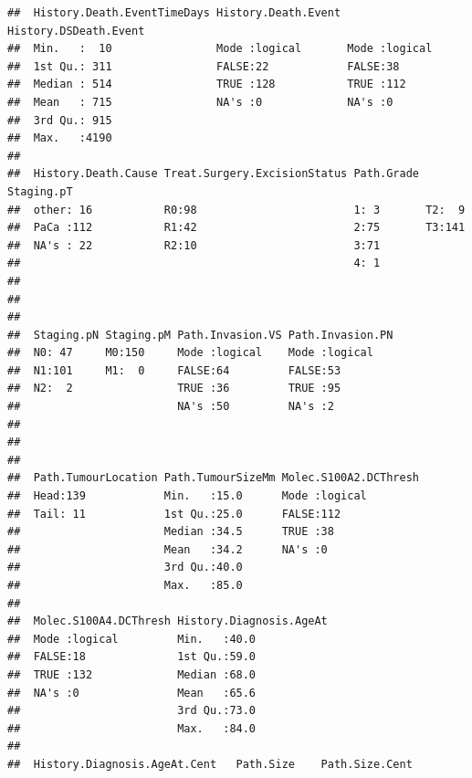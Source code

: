 \documentclass{article}\usepackage[]{graphicx}\usepackage[]{color}
\makeatletter
\newenvironment{kframe}{%
 \def\at@end@of@kframe{}%
 \ifinner\ifhmode%
  \def\at@end@of@kframe{\end{minipage}}%
  \begin{minipage}{\columnwidth}%
 \fi\fi%
 \def\FrameCommand##1{\hskip\@totalleftmargin \hskip-\fboxsep
 \colorbox{shadecolor}{##1}\hskip-\fboxsep
     \hskip-\linewidth \hskip-\@totalleftmargin \hskip\columnwidth}%
 \MakeFramed {\advance\hsize-\width
   \@totalleftmargin\z@ \linewidth\hsize
   \@setminipage}}%
 {\par\unskip\endMakeFramed%
 \at@end@of@kframe}
\newenvironment{knitrout}{}{} %
\makeatother
\begin{document}
\begin{knitrout}
\begin{kframe}
\begin{verbatim}
##  History.Death.EventTimeDays History.Death.Event History.DSDeath.Event
##  Min.   :  10                Mode :logical       Mode :logical        
##  1st Qu.: 311                FALSE:22            FALSE:38             
##  Median : 514                TRUE :128           TRUE :112            
##  Mean   : 715                NA's :0             NA's :0              
##  3rd Qu.: 915                                                         
##  Max.   :4190                                                         
##                                                                       
##  History.Death.Cause Treat.Surgery.ExcisionStatus Path.Grade Staging.pT
##  other: 16           R0:98                        1: 3       T2:  9    
##  PaCa :112           R1:42                        2:75       T3:141    
##  NA's : 22           R2:10                        3:71                 
##                                                   4: 1                 
##                                                                        
##                                                                        
##                                                                        
##  Staging.pN Staging.pM Path.Invasion.VS Path.Invasion.PN
##  N0: 47     M0:150     Mode :logical    Mode :logical   
##  N1:101     M1:  0     FALSE:64         FALSE:53        
##  N2:  2                TRUE :36         TRUE :95        
##                        NA's :50         NA's :2         
##                                                         
##                                                         
##                                                         
##  Path.TumourLocation Path.TumourSizeMm Molec.S100A2.DCThresh
##  Head:139            Min.   :15.0      Mode :logical        
##  Tail: 11            1st Qu.:25.0      FALSE:112            
##                      Median :34.5      TRUE :38             
##                      Mean   :34.2      NA's :0              
##                      3rd Qu.:40.0                           
##                      Max.   :85.0                           
##                                                             
##  Molec.S100A4.DCThresh History.Diagnosis.AgeAt
##  Mode :logical         Min.   :40.0           
##  FALSE:18              1st Qu.:59.0           
##  TRUE :132             Median :68.0           
##  NA's :0               Mean   :65.6           
##                        3rd Qu.:73.0           
##                        Max.   :84.0           
##                                               
##  History.Diagnosis.AgeAt.Cent   Path.Size    Path.Size.Cent  

\end{verbatim}
\end{kframe}
\end{knitrout}
\end{document}
